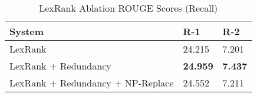 \begin{table}[H]
\centering
\begin{tabular}{|p{4cm}|p{1cm}|p{1cm}|}
  \hline
    System  & R-1 & R-2 \\ \hline
    LexRank & 24.215 & 7.201 \\
    LexRank $+$ Redundancy & \textbf{24.959} & \textbf{7.437} \\
    LexRank $+$ Redundancy $+$ NP-Replace & 24.552 & 7.211 \\ \hline

\end{tabular} \caption{LexRank Ablation ROUGE Scores (Recall)}
\label{tab:ablation}
\end{table}